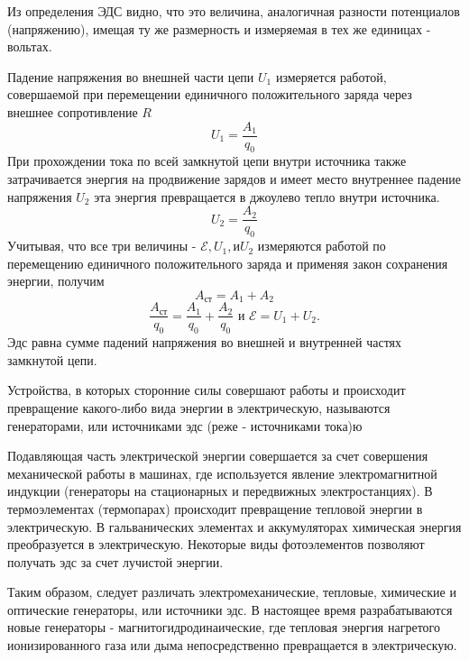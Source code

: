 \documentclass[a4paper,10pt]{book}
\begin{document}
Из определения ЭДС видно, что это величина, аналогичная разности потенциалов (напряжению), имещая ту же размерность и измеряемая в тех же
единицах - вольтах.

Падение напряжения во внешней части цепи $U_1$ измеряется работой, совершаемой при перемещении единичного положительного заряда через 
внешнее сопротивление $R$
\begin{equation}\label{u1}
 U_1 = \frac{A_1}{q_0}
\end{equation}
При прохождении тока по всей замкнутой цепи внутри источника также затрачивается энергия на продвижение зарядов и имеет место внутреннее
падение напряжения $U_2$ эта энергия превращается в джоулево тепло внутри источника.
\begin{equation}\label{u2}
 U_2 = \frac{A_2}{q_0}
\end{equation}
Учитывая, что все три величины - $\mathcal{E}, U_1, \text{и} U_2$ измеряются работой по перемещению единичного положительного заряда и 
применяя закон сохранения энергии, получим
\begin{equation}\label{Aex}
 A_\text{ст} = A_1 + A_2
\end{equation}
\begin{equation}\label{Aex/q0}
 \frac{A_\text{ст}}{q_0} = \frac{A_1}{q_0} + \frac{A_2}{q_0} \text{ и } \mathcal{E} = U_1 + U_2.
\end{equation}
Эдс равна сумме падений напряжения во внешней и внутренней частях замкнутой цепи.

Устройства, в которых сторонние силы совершают работы и происходит превращение какого-либо вида энергии в электрическую, называются генераторами,
или источниками эдс (реже - источниками тока)ю

Подавляющая часть электрической энергии совершается за счет совершения механической работы в машинах, где используется явление электромагнитной
индукции (генераторы на стационарных и передвижных электростанциях). В термоэлементах (термопарах) происходит превращение тепловой энергии 
в электрическую. В гальванических элементах и аккумуляторах химическая энергия преобразуется в электрическую. Некоторые виды фотоэлементов
позволяют получать эдс за счет лучистой энергии.

Таким образом, следует различать электромеханические, тепловые, химические и оптические генераторы, или источники эдс. В настоящее время
разрабатываются новые генераторы - магнитогидродинаические, где тепловая энергия нагретого ионизированного газа или дыма непосредственно 
превращается в электрическую.
\end{document}
